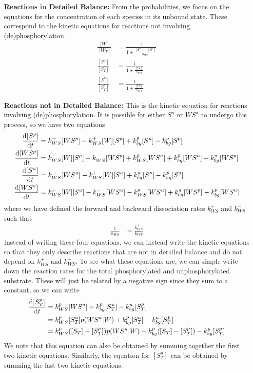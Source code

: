 \documentclass[aps,onecolumn,superscriptaddress,notitlepage]{revtex4-1}
\begin{document}
\textbf{Reactions in Detailed Balance:}
From the probabilities, we focus on the equations for the concentration of each species in its unbound state.
These correspond to the kinetic equations for reactions not involving (de)phosphorylation.
\begin{align}
\frac{[W]}{[W_T]} & = \frac{1}{1 + \frac{[S^u] +[S^p]}{\alpha_{WS}}}\label{eq:onewayW}\\
\frac{[S^u]}{[S^u_T]} &= \frac{1}{1 + \frac{[W]}{\alpha_{WS}}}\label{eq:onewaySu}\\
\frac{[S^p]}{[S^p_T]} &=  \frac{1}{1 + \frac{[W]}{\alpha_{WS}}}\label{eq:onewaySp}
\end{align}

\textbf{Reactions not in  Detailed Balance:}
This is the kinetic equation for reactions involving (de)phosphorylation. 
It is possible for either $S^u$ or $WS^u$ to undergo this process, so we have two equations
\begin{align}
\dv{[S^p]}{t} &=  k_{WS}^-[WS^p] - k_{WS}^+[W][S^p] + k_{bg}^p[S^u] - k_{bg}^u[S^p]\\
\dv{[WS^p]}{t} &= k_{WS}^+[W][S^p] -k_{WS}^-[WS^p] + k_{WS}^p[WS^u] + k_{bg}^p[WS^u] - k_{bg}^u[WS^p]\\
\dv{[S^u]}{t} &=  k_{WS}^-[WS^u] - k_{WS}^+[W][S^u] + k_{bg}^u[S^p] - k_{bg}^p[S^u]\\
\dv{[WS^u]}{t} &= k_{WS}^+[W][S^u] -k_{WS}^-[WS^u] - k_{WS}^p[WS^u] + k_{bg}^u[WS^p] - k_{bg}^p[WS^u]
\end{align}
where we have defined the forward and backward dissociation rates $k_{WS}^+$ and $k_{WS}^-$ such that
\begin{align}
\frac{1}{\alpha_{WS}} &= \frac{k_{WS}^+}{k_{WS}^-}
\end{align}
Instead of writing these four equations, we can instead write the kinetic equations so that they only describe reactions that are not in detailed balance and do not depend on $k_{WS}^+$ and $k_{WS}^-$. To see what these equations are, we can simple write down the reaction rates for the total phosphorylated and unphosphorylated substrate.
These will just be related by a negative sign since they sum to a constant, so we can write
\begin{align}
\dv{[S^p_T]}{t} &= k_{WS}^p[WS^u] + k_{bg}^p[S_T^u] - k_{bg}^u[S_T^p]\\
&= k_{WS}^p[S_T^u]p(WS^u|W) + k_{bg}^p[S_T^u] - k_{bg}^u[S_T^p]\\
&= k_{WS}^p([S_T]-[S_T^p])p(WS^u|W) + k_{bg}^p([S_T]-[S_T^p]) - k_{bg}^u[S_T^p]
\end{align}
We note that this equation can also be obtained by summing together the first two kinetic equations. Similarly, the equation for $[S^u_T]$ can be obtained by summing the last two kinetic equations.
\end{document}
